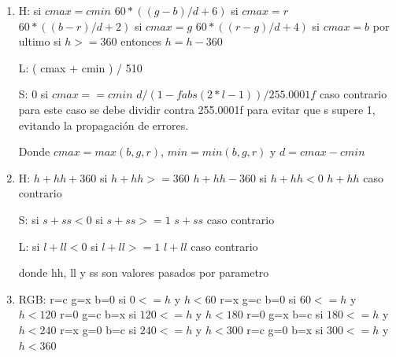 \documentclass[a4paper]{article}
\begin{document}
\begin{enumerate}
	\item 
		H:  si $cmax = cmin$\newline
		$60 * ( (g-b)/d + 6 )$ si $cmax = r$\newline
		$60 * ( (b-r)/d + 2 )$ si $cmax = g$\newline
		$60 * ( (r-g)/d + 4 )$ si $cmax = b$\newline
		por ultimo si $h >= 360$ entonces $h = h - 360$\newline

		L: ( cmax + cmin ) / 510\newline

		S:\newline
		$0$ si $cmax == cmin$\newline
		$d / ( 1 - fabs( 2*l - 1 ) ) / 255.0001f$ caso contrario\newline
	  para este caso se debe dividir contra 255.0001f para evitar que s supere 1, evitando la propagación de errores.\newline

		Donde $cmax = max(b,g,r)$, $min = min(b,g,r)$ y $d = cmax - cmin$\newline
	
	\item 
		H:\newline
		$h + hh + 360$ si $h+hh >= 360$\newline
		$h + hh - 360$ si $h+hh < 0$\newline
		$h + hh$ caso contrario\newline

		S: si $s+ss < 0$ si $s+ss >= 1$\newline
		$s + ss$ caso contrario\newline

		L: si $l+ll < 0$ si $l+ll >= 1 $\newline
		$l+ll$ caso contrario\newline

		donde hh, ll y ss son valores pasados por parametro
		\newpage

	\item
		RGB:\newline
			r=c g=x b=0 si $0<=h$ y $h<60$\newline
			r=x g=c b=0 si $60<=h$ y $h<120$\newline
			r=0 g=c b=x si $120<=h$ y $h<180$\newline
			r=0 g=x b=c si $180<=h$ y $h<240$\newline
			r=x g=0 b=c si $240<=h$ y $h<300$\newline
			r=c g=0 b=x si $300<=h$ y $h<360$\newline


\end{enumerate}
\end{document}
